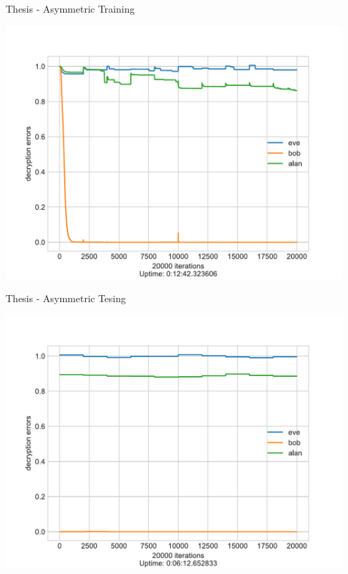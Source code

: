 \documentclass[a4paper, 12pt]{report}
\begin{document}
\begin{blockfigure}{Thesis - Asymmetric Training}
	\begin{center}
		\includegraphics[width = 0.95\textwidth]{neurencoder-asymmetric-training}
	\end{center}
\end{blockfigure}
\begin{blockfigure}{Thesis - Asymmetric Tesing}
	\begin{center}
		\includegraphics[width = 0.95\textwidth]{neurencoder-asymmetric-testing}
	\end{center}
\end{blockfigure}
\newpage
\end{document}
